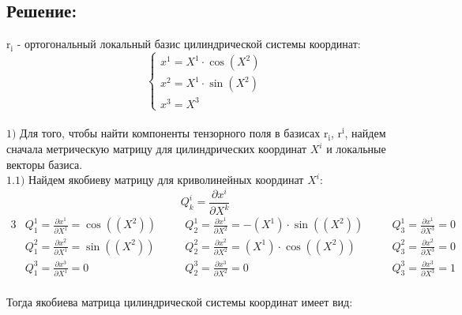 \documentclass[a4paper, 12pt, oneside]{article}
\begin{document}
\subsection*{Решение:}
$\mathrm{r_i}$ - ортогональный локальный базис цилиндрической системы координат:\\
\[
\begin{cases}
  x^1 = X^1 \cdot \cos(X^2)\\
  x^2 = X^1 \cdot \sin(X^2)\\
  x^3 = X^3
\end{cases}
\]\\
$\mathrm{1)}$ Для того, чтобы найти компоненты тензорного поля в базисах $\mathrm{r_i}$, $\mathrm{r^i}$,
найдем сначала метрическую матрицу для цилиндрических координат $X^i$ и локальные векторы базиса.\\
$\mathrm{1.1)}$ Найдем якобиеву матрицу для криволинейных координат $X^i$:\\
\[
Q^i_k = \frac{\partial x^i}{\partial X^k}
\]
\begin{alignat*}{3}
  & Q^1_1 = \frac{\partial x^1}{\partial X^1} = \cos((X^2)) \quad &&Q^1_2 = \frac{\partial x^1}{\partial X^2} = -(X^1)\cdot \sin((X^2)) \quad &&Q^1_3 = \frac{\partial x^1}{\partial X^3} = 0 \\
  & Q^2_1 = \frac{\partial x^2}{\partial X^1} = \sin((X^2)) \quad &&Q^2_2 = \frac{\partial x^2}{\partial X^2} = (X^1)\cdot \cos((X^2)) \quad &&Q^2_3 = \frac{\partial x^2}{\partial X^3} = 0 \\
  & Q^3_1 = \frac{\partial x^3}{\partial X^1} = 0 \quad &&Q^3_2 = \frac{\partial x^3}{\partial X^2} = 0 \quad &&Q^3_3 = \frac{\partial x^3}{\partial X^3} = 1 
\end{alignat*}\\
Тогда якобиева матрица цилиндрической системы координат имеет вид:\\
\end{document}
